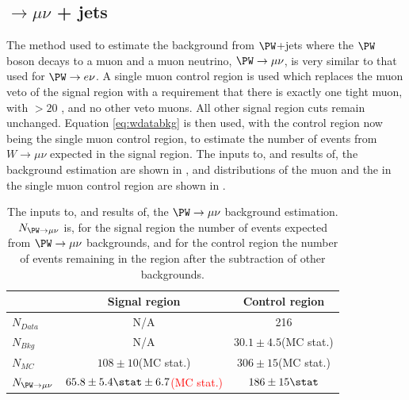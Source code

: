 \subsection{\PW$\rightarrow \mu\nu$ + jets}
\label{sec:promptwmunu}
The method used to estimate the background from $\PW$+jets where the $\PW$ boson decays to a muon and a muon neutrino, $\PW\rightarrow\mu\nu$, is very similar to that used for $\PW\rightarrow e\nu$. A single muon control region is used which replaces the muon veto of the signal region with a requirement that there is exactly one tight muon, with \pt$>20$ \GeV, and no other veto muons. All other signal region cuts remain unchanged. Equation \ref{eq:wdatabkg} is then used, with the control region now being the single muon control region, to estimate the number of events from $W\rightarrow\mu\nu$ expected in the signal region. The inputs to, and results of, the background estimation are shown in , and distributions of the muon \pt and the \METnoMU in the single muon control region are shown in .

\begin{table}
  \caption{The inputs to, and results of, the $\PW\rightarrow \mu\nu$ background estimation. $N_{\PW\rightarrow \mu\nu}$ is, for the signal region the number of events expected from $\PW\rightarrow \mu\nu$ backgrounds, and for the control region the number of events remaining in the region after the subtraction of other backgrounds.}
  \label{tab:promptwmunu}
  \begin{tabular}{lcc}
    \hline
    \hline
    & Signal region & Control region \\
    \hline
    \hline
    $N_{Data}$ & N/A & 216\\
    $N_{Bkg}$ & N/A & $30.1\pm 4.5$(\ac{MC} stat.) \\
    $N_{MC}$& $108\pm 10$(\ac{MC} stat.) & $306\pm 15$(\ac{MC} stat.) \\
    \hline
    $N_{\PW\rightarrow \mu\nu}$& \textcolor{red}{$65.8\pm 5.4\stat\pm 6.7$(MC stat.)} & $186\pm 15\stat$ \\
    \hline
    \hline
  \end{tabular}
\end{table}

